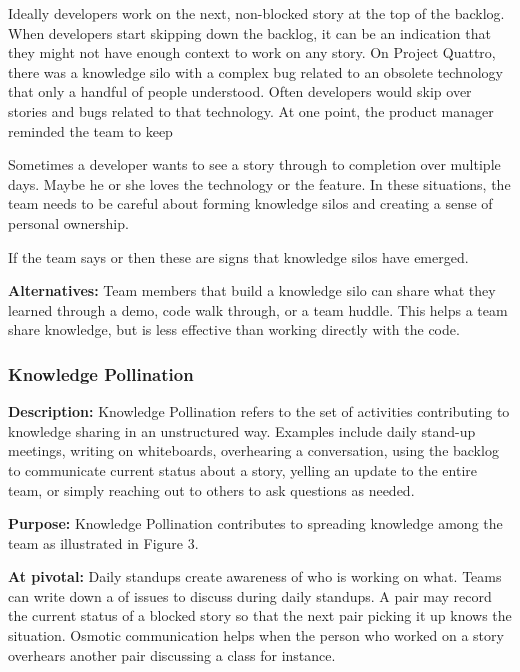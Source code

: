 \begin{table}[]
Ideally developers work on the next, non-blocked story at the top of the backlog. When developers start skipping down the backlog, it can be an indication that they might not have enough context to work on any story. On Project Quattro, there was a knowledge silo with a complex bug related to an obsolete technology that only a handful of people understood. Often developers would skip over stories and bugs related to that technology. At one point, the product manager reminded the team to keep 

Sometimes a developer wants to see a story through to completion over multiple days. Maybe he or she loves the technology or the feature. In these situations, the team needs to be careful about forming knowledge silos and creating a sense of personal ownership.

If the team says  or  then these are signs that knowledge silos have emerged. 

\textbf{Alternatives:} Team members that build a knowledge silo can share what they learned through a demo, code walk through, or a team huddle. This helps a team share knowledge, but is less effective than working directly with the code. 

\subsubsection{Knowledge Pollination}
\textbf{Description:} Knowledge Pollination refers to the set of activities contributing to knowledge sharing in an unstructured way. Examples include daily stand-up meetings, writing on whiteboards, overhearing a conversation, using the backlog to communicate current status about a story, yelling an update to the entire team, or simply reaching out to others to ask questions as needed. 

\textbf{Purpose:} Knowledge Pollination contributes to spreading knowledge among the team as illustrated in Figure 3.

\textbf{At pivotal:} Daily standups create awareness of who is working on what. Teams can write down a  of issues to discuss during daily standups. A pair may record the current status of a blocked story so that the next pair picking it up knows the situation. Osmotic communication helps when the person who worked on a story overhears another pair discussing a class for instance.


\end{table}
